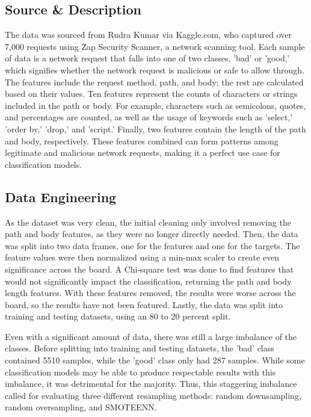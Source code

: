 \documentclass[conference]{IEEEtran}
\begin{document}
    \subsection{Source \& Description}
    The data was sourced from Rudra Kumar via Kaggle.com\cite{KumarKaggle}, who captured over 7,000 requests using Zap Security Scanner\cite{zap}, a network scanning tool. Each sample of data is a network request that falls into one of two classes, 'bad' or 'good,' which signifies whether the network request is malicious or safe to allow through. The features include the request method, path, and body; the rest are calculated based on their values. Ten features represent the counts of characters or strings included in the path or body. For example, characters such as semicolons, quotes, and percentages are counted, as well as the usage of keywords such as 'select,' 'order by,' 'drop,' and 'script.' Finally, two features contain the length of the path and body, respectively. These features combined can form patterns among legitimate and malicious network requests, making it a perfect use case for classification models.

    \subsection{Data Engineering}
    As the dataset was very clean, the initial cleaning only involved removing the path and body features, as they were no longer directly needed. Then, the data was split into two data frames, one for the features and one for the targets. The feature values were then normalized using a min-max scaler to create even significance across the board. A Chi-square test was done to find features that would not significantly impact the classification, returning the path and body length features. With these features removed, the results were worse across the board, so the results have not been featured. Lastly, the data was split into training and testing datasets, using an 80 to 20 percent split.

    Even with a significant amount of data, there was still a large imbalance of the classes. Before splitting into training and testing datasets, the 'bad' class contained 5510 samples, while the 'good' class only had 287 samples. While some classification models may be able to produce respectable results with this imbalance, it was detrimental for the majority. Thus, this staggering imbalance called for evaluating three different resampling methods: random downsampling, random oversampling, and SMOTEENN.
\end{document}
